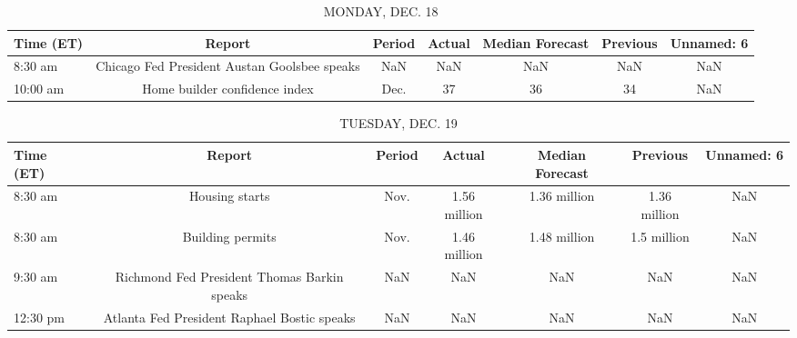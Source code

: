 \documentclass{article}%
\begin{document}
%
\normalsize%


\begin{table}[htbp]%
\caption{MONDAY, DEC. 18}%
\centering%
\begin{adjustbox}{width=1\textwidth}%
\begin{tabular}{lcccccc}
\toprule
Time (ET) &                                       Report & Period & Actual & Median Forecast & Previous & Unnamed: 6 \\
\midrule
  8:30 am & Chicago Fed President Austan Goolsbee speaks &    NaN &    NaN &             NaN &      NaN &        NaN \\
 10:00 am &                Home builder confidence index &   Dec. &     37 &              36 &       34 &        NaN \\
\bottomrule
\end{tabular}
%
\end{adjustbox}%
\end{table}

%


\begin{table}[htbp]%
\caption{TUESDAY, DEC. 19}%
\centering%
\begin{adjustbox}{width=1\textwidth}%
\begin{tabular}{lcccccc}
\toprule
Time (ET) &                                      Report & Period &       Actual & Median Forecast &     Previous & Unnamed: 6 \\
\midrule
  8:30 am &                              Housing starts &   Nov. & 1.56 million &    1.36 million & 1.36 million &        NaN \\
  8:30 am &                            Building permits &   Nov. & 1.46 million &    1.48 million &  1.5 million &        NaN \\
  9:30 am & Richmond Fed President Thomas Barkin speaks &    NaN &          NaN &             NaN &          NaN &        NaN \\
 12:30 pm & Atlanta Fed President Raphael Bostic speaks &    NaN &          NaN &             NaN &          NaN &        NaN \\
\bottomrule
\end{tabular}
%
\end{adjustbox}%
\end{table}

%
\end{document}
